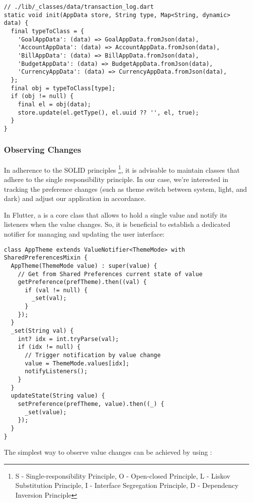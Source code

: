 \begin{lstlisting}[firstnumber=54]
// ./lib/_classes/data/transaction_log.dart
static void init(AppData store, String type, Map<String, dynamic> data) {
  final typeToClass = {
    'GoalAppData': (data) => GoalAppData.fromJson(data),
    'AccountAppData': (data) => AccountAppData.fromJson(data),
    'BillAppData': (data) => BillAppData.fromJson(data),
    'BudgetAppData': (data) => BudgetAppData.fromJson(data),
    'CurrencyAppData': (data) => CurrencyAppData.fromJson(data),
  };
  final obj = typeToClass[type];
  if (obj != null) {
    final el = obj(data);
    store.update(el.getType(), el.uuid ?? '', el, true);
  }
}
\end{lstlisting}


\subsubsection{Observing Changes}

In adherence to the SOLID principles \footnote{S - Single-responsibility Principle, O - Open-closed Principle, L - 
Liskov Substitution Principle, I - Interface Segregation Principle, D - Dependency Inversion Principle}, it is advisable 
to maintain classes that adhere to the single responsibility principle. In our case, we're interested in tracking the 
preference changes (such as theme switch between system, light, and dark) and adjust our application in accordance.

In Flutter, a  is a core class that allows to hold a single value and notify its listeners when the 
value changes. So, it is beneficial to establish a dedicated notifier for managing and updating the user interface:

\begin{lstlisting}
class AppTheme extends ValueNotifier<ThemeMode> with SharedPreferencesMixin {
  AppTheme(ThemeMode value) : super(value) {
    // Get from Shared Preferences current state of value
    getPreference(prefTheme).then((val) {
      if (val != null) {
        _set(val);
      }
    });
  }
  _set(String val) {
    int? idx = int.tryParse(val);
    if (idx != null) {
      // Trigger notification by value change
      value = ThemeMode.values[idx];
      notifyListeners();
    }
  }
  updateState(String value) {
    setPreference(prefTheme, value).then((_) {
      _set(value);
    });
  }
}
\end{lstlisting}

\noindent The simplest way to observe value changes can be achieved by using :


